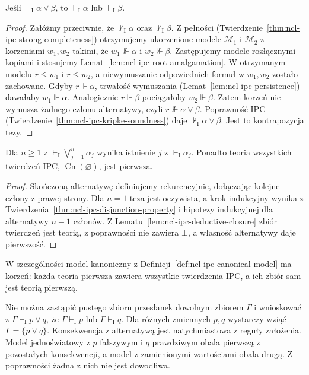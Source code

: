 \begin{twierdzenie}
\label{thm:ncl-ipc-disjunction-property}
Jeśli $\vdash_{\mathrm I}\alpha\vee\beta$, to
$\vdash_{\mathrm I}\alpha$ lub $\vdash_{\mathrm I}\beta$.
\end{twierdzenie}
\begin{proof}
Załóżmy przeciwnie, że $\nvdash_{\mathrm I}\alpha$
oraz $\nvdash_{\mathrm I}\beta$. Z pełności
(Twierdzenie~\ref{thm:ncl-ipc-strong-completeness})
otrzymujemy ukorzenione modele $\mathcal M_1$
i $\mathcal M_2$ z korzeniami $w_1,w_2$ takimi, że
$w_1\not\Vdash\alpha$ i $w_2\not\Vdash\beta$.
Zastępujemy modele rozłącznymi kopiami i stosujemy
Lemat~\ref{lem:ncl-ipc-root-amalgamation}.
W otrzymanym modelu $r\leq w_1$ i $r\leq w_2$,
a niewymuszanie odpowiednich formuł w $w_1,w_2$
zostało zachowane.
Gdyby $r\Vdash\alpha$, trwałość wymuszania
(Lemat~\ref{lem:ncl-ipc-persistence}) dawałaby
$w_1\Vdash\alpha$. Analogicznie $r\Vdash\beta$
pociągałoby $w_2\Vdash\beta$.
Zatem korzeń nie wymusza żadnego członu alternatywy,
czyli $r\not\Vdash\alpha\vee\beta$.
Poprawność IPC
(Twierdzenie~\ref{thm:ncl-ipc-kripke-soundness})
daje $\nvdash_{\mathrm I}\alpha\vee\beta$.
Jest to kontrapozycja tezy.
\end{proof}

\begin{wniosek}
\label{cor:ncl-ipc-theorem-prime}
Dla $n\geq1$ z
$\vdash_{\mathrm I}\bigvee_{j=1}^n\alpha_j$
wynika istnienie $j$ z $\vdash_{\mathrm I}\alpha_j$.
Ponadto teoria wszystkich twierdzeń IPC,
$\operatorname{Cn}(\varnothing)$, jest pierwsza.
\end{wniosek}
\begin{proof}
Skończoną alternatywę definiujemy rekurencyjnie,
dołączając kolejne człony z prawej strony.
Dla $n=1$ teza jest oczywista, a krok indukcyjny
wynika z Twierdzenia~\ref{thm:ncl-ipc-disjunction-property}
i hipotezy indukcyjnej dla alternatywy $n-1$ członów.
Z Lematu~\ref{lem:ncl-ipc-deductive-closure}
zbiór twierdzeń jest teorią, z poprawności nie
zawiera $\bot$, a własność alternatywy daje
pierwszość.
\end{proof}
W szczególności model kanoniczny
z Definicji~\ref{def:ncl-ipc-canonical-model}
ma korzeń: każda teoria pierwsza zawiera wszystkie
twierdzenia IPC, a ich zbiór sam jest teorią pierwszą.

\begin{przyklad}
\label{ex:ncl-ipc-relative-disjunction}
Nie można zastąpić pustego zbioru przesłanek
dowolnym zbiorem $\Gamma$ i wnioskować z
$\Gamma\vdash_{\mathrm I}p\vee q$, że
$\Gamma\vdash_{\mathrm I}p$ lub $\Gamma\vdash_{\mathrm I}q$.
Dla różnych zmiennych $p,q$ wystarczy wziąć
$\Gamma=\{p\vee q\}$. Konsekwencja z alternatywą
jest natychmiastowa z reguły założenia.
Model jednoświatowy z $p$ fałszywym i $q$ prawdziwym
obala pierwszą z pozostałych konsekwencji,
a model z zamienionymi wartościami obala drugą.
Z poprawności żadna z nich nie jest dowodliwa.
\end{przyklad}

